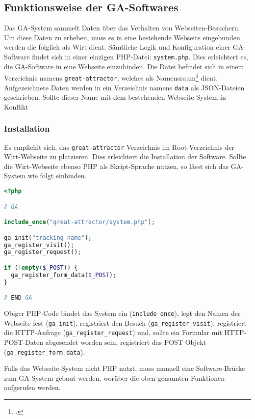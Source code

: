 \subsection{Funktionsweise der GA-Softwares}
\label{sub:funktionsweise_der_ga_softwares}
Das GA-System sammelt Daten über das Verhalten von Webseiten-Besuchern. Um
diese Daten zu erheben, muss es in eine bestehende Webseite eingebunden werden
die folglich als Wirt dient. Sämtliche Logik und Konfiguration einer
GA-Software findet sich in einer einzigen PHP-Datei: \texttt{system.php}. Dies
erleichtert es, die GA-Software in eine Webseite einzubinden. Die Datei
befindet sich in einem Verzeichnis namens \texttt{great-attractor}, welches als
Namensraum\footcite{wp:namensraum} dient. Aufgezeichnete Daten werden in ein
Verzeichnis namens \texttt{data} als JSON-Dateien geschrieben. Sollte dieser
Name mit dem bestehenden Webseite-System in Konflikt

\subsubsection{Installation}
\label{ssub:ga_installation}
Es empfiehlt sich, das \texttt{great-attractor} Verzeichnis im Root-Verzeichnis
der Wirt-Webseite zu platzieren. Dies erleichtert die Installation der
Software. Sollte die Wirt-Webseite ebenso PHP als Skript-Sprache nutzen, so
lässt sich das GA-System wie folgt einbinden.

\begin{lstlisting}[language=PHP]
<?php

# GA

include_once("great-attractor/system.php");

ga_init("tracking-name");
ga_register_visit();
ga_register_request();

if (!empty($_POST)) {
  ga_register_form_data($_POST);
}

# END GA
\end{lstlisting}

Obiger PHP-Code bindet das System ein (\texttt{include\_once}), legt den Namen
der Webseite fest (\texttt{ga\_init}), registriert den Besuch
(\texttt{ga\_register\_visit}), registriert die HTTP-Anfrage
(\texttt{ga\_register\_request}) und, sollte ein Formular mit HTTP-POST-Daten
abgesendet worden sein, registriert das POST Objekt
(\texttt{ga\_register\_form\_data}).

Falls das Webseite-System nicht PHP nutzt, muss manuell eine Software-Brücke
zum GA-System gebaut werden, worüber die oben genannten Funktionen aufgerufen
werden.

